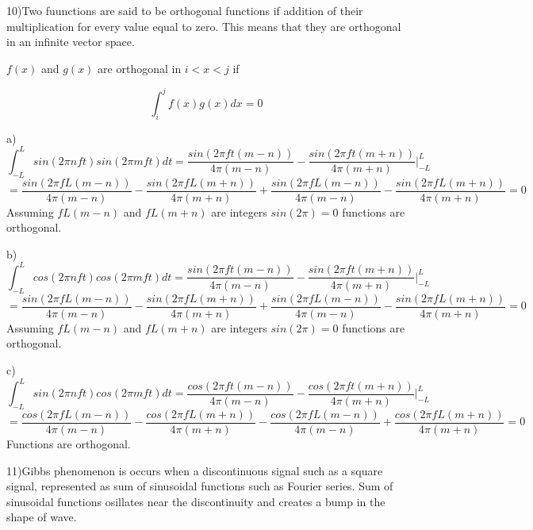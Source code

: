 \documentclass{article}
\begin{document}
	10)Two fuunctions are said to be orthogonal functions if addition of their multiplication for every value equal to zero. This means that they are orthogonal in an infinite vector space.
	
	$f(x)$ and $g(x)$ are orthogonal in $i<x<j$ if
	
	$$\int_{i}^{j}f(x)g(x)dx=0$$
	\par
	a)
	$$\int_{-L}^{L}sin(2\pi nft)sin(2\pi mft)dt=
	\frac{sin(2 \pi f t (m-n))}{4\pi(m-n)} -\frac{sin(2 \pi f t (m+n))}{4\pi(m+n)}|_{-L}^L$$
	$$=\frac{sin(2 \pi f L (m-n))}{4\pi(m-n)} -\frac{sin(2 \pi f L (m+n))}{4\pi(m+n)}+\frac{sin(2 \pi f L (m-n))}{4\pi(m-n)} -\frac{sin(2 \pi f L (m+n))}{4\pi(m+n)}=0$$
	Assuming $fL(m-n)$ and $fL(m+n)$ are integers $sin(2\pi)=0$ functions are orthogonal.
	\par
	
	b)
	$$\int_{-L}^{L}cos(2\pi nft)cos(2\pi mft)dt=
	\frac{sin(2 \pi f t (m-n))}{4\pi(m-n)} -\frac{sin(2 \pi f t (m+n))}{4\pi(m+n)}|_{-L}^L$$
	$$=\frac{sin(2 \pi f L (m-n))}{4\pi(m-n)} -\frac{sin(2 \pi f L (m+n))}{4\pi(m+n)}+\frac{sin(2 \pi f L (m-n))}{4\pi(m-n)} -\frac{sin(2 \pi f L (m+n))}{4\pi(m+n)}=0$$
	Assuming $fL(m-n)$ and $fL(m+n)$ are integers $sin(2\pi)=0$ functions are orthogonal.
	\par
	
	c)
	$$\int_{-L}^{L}sin(2\pi nft)cos(2\pi mft)dt=
	\frac{cos(2 \pi f t (m-n))}{4\pi(m-n)} -\frac{cos(2 \pi f t (m+n))}{4\pi(m+n)}|_{-L}^L$$
	$$=\frac{cos(2 \pi f L (m-n))}{4\pi(m-n)} -\frac{cos(2 \pi f L (m+n))}{4\pi(m+n)}-\frac{cos(2 \pi f L (m-n))}{4\pi(m-n)} +\frac{cos(2 \pi f L (m+n))}{4\pi(m+n)}=0$$
	Functions are orthogonal.
	
	\par
	
	11)Gibbs phenomenon is occurs when a discontinuous signal such as a square signal, represented as sum of sinusoidal functions such as Fourier series. Sum of sinusoidal functions osillates near the discontinuity and creates a bump in the shape of wave.
	
	
\end{document}

